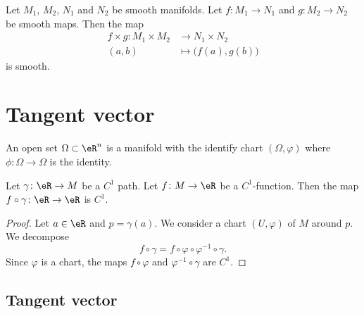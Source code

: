 \begin{proposition}	\label{PROPooXFUTooCNzDHf}
	Let \( M_1\), \( M_2\), \( N_1\) and \( N_2\) be smooth manifolds. Let \(f \colon M_1\to N_1  \) and \(g \colon M_2\to N_2  \) be smooth maps. Then the map
	\begin{equation}
		\begin{aligned}
			f\times g\colon M_1\times M_2 & \to N_1\times N_2              \\
			(a,b)                         & \mapsto \big( f(a), g(b) \big)
		\end{aligned}
	\end{equation}
	is smooth.
\end{proposition}

\section{Tangent vector}

\begin{definition}
	An open set \( \Omega\subset \eR^n\) is a manifold with the identify chart \( (\Omega, \varphi)\) where \( \phi\colon \Omega\to \Omega\) is the identity.
\end{definition}

\begin{lemma}		\label{LEMooMFQNooMTtpRp}
	Let \( \gamma\colon \eR\to M\) be a \( C^1\) path. Let \( f\colon M\to \eR\) be a \( C^1\)-function. Then the map \( f\circ \gamma\colon \eR\to \eR\) is \( C^1\).
\end{lemma}

\begin{proof}
	Let \( a\in \eR\) and \( p=\gamma(a)\). We consider a chart \( (U,\varphi)\) of \( M\) around \( p\). We decompose
	\begin{equation}
		f\circ \gamma= f\circ \varphi\circ \varphi^{-1}\circ\gamma.
	\end{equation}
	Since \( \varphi\) is a chart, the maps \( f\circ\varphi\) and \( \varphi^{-1}\circ\gamma\) are \( C^1\).
\end{proof}


\subsection{Tangent vector}

